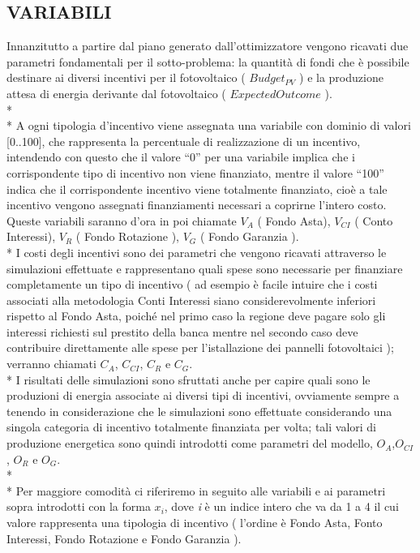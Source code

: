 \documentclass[12pt,a4paper,openright,twoside]{report}
\begin{document}
\subsection{VARIABILI}
Innanzitutto a partire dal piano generato dall'ottimizzatore vengono ricavati due parametri fondamentali per il sotto-problema: la quantità di fondi che è possibile destinare ai diversi incentivi per il fotovoltaico (  $Budget_{PV}$ ) e la produzione attesa di energia derivante dal fotovoltaico ( $ExpectedOutcome$ ).
\\* \\*
A ogni tipologia d'incentivo viene assegnata una variabile con dominio di valori [0..100], che rappresenta la percentuale di realizzazione di un incentivo, intendendo con questo che il valore  “0” per una variabile implica che i corrispondente tipo di incentivo non viene finanziato, mentre il valore “100” indica che il corrispondente incentivo viene totalmente finanziato, cioè a tale incentivo vengono assegnati finanziamenti necessari a coprirne l'intero costo. Queste variabili saranno d'ora in poi chiamate $V_A$ ( Fondo Asta), $V_{CI}$ ( Conto Interessi), $V_R$ ( Fondo Rotazione ), $V_G$ ( Fondo Garanzia ).\\*
I costi degli incentivi sono dei parametri che vengono ricavati attraverso le simulazioni effettuate e rappresentano quali spese sono necessarie per finanziare completamente un tipo di incentivo ( ad esempio è facile intuire che i costi associati alla metodologia Conti Interessi siano considerevolmente inferiori rispetto al Fondo Asta, poiché nel primo caso la regione deve pagare solo gli interessi richiesti sul prestito della banca mentre nel  secondo caso deve contribuire direttamente alle spese per l'istallazione dei pannelli fotovoltaici ); verranno chiamati $C_A$, $C_{CI}$, $C_R$ e $C_G$. \\*
I risultati delle simulazioni sono sfruttati anche per capire quali sono le produzioni di energia associate ai diversi tipi di incentivi, ovviamente sempre a tenendo in  considerazione che le simulazioni sono effettuate considerando una singola categoria di incentivo totalmente finanziata per volta; tali valori di produzione energetica sono quindi introdotti come parametri del modello, $O_A$,$ O_{CI}$, $O_R$ e $O_G$.
\\* \\*
Per maggiore comodità ci riferiremo in seguito alle variabili e ai parametri sopra introdotti con la forma $ x_i $, dove \emph{i} è un indice intero che va da 1 a 4 il cui valore rappresenta una tipologia di incentivo ( l'ordine è Fondo Asta, Fonto Interessi, Fondo Rotazione e Fondo Garanzia ).
\end{document}
